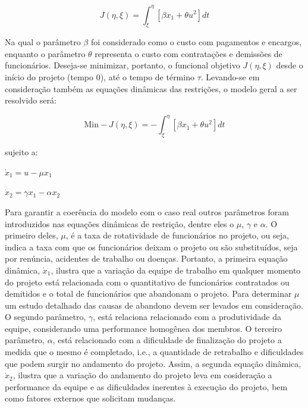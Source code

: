 \documentclass[14pt, oneside]{book}
\theoremstyle{definition}
\begin{document}
            $$J\left(\eta,\xi \right) = \int_{\xi}^{\eta}\left[{\beta x_1 + \theta u^2}\right]dt$$
            
            Na qual o parâmetro $\beta$ foi considerado como o custo com pagamentos e encargos, enquanto o parâmetro $\theta$ representa o custo com contratações e demissões de funcionários. Deseja-se minimizar, portanto, o funcional objetivo $J\left(\eta,\xi \right)$ desde o início do projeto (tempo 0), até o tempo de término $\tau$. Levando-se em consideração também as equações dinâmicas das restrições, o modelo geral a ser resolvido será:
            
            $$\text{Min} -J\left(\eta,\xi \right) =- \int_{\xi}^{\eta}\left[{\beta x_1 + \theta u^2}\right]dt$$
            
            sujeito a:
            
            \begin{center}
            $\dot{x}_1 = u - \mu x_1$
            
            $\dot{x}_2 = \gamma x_1 - \alpha x_2$
            
            \end{center}
           
             Para garantir a coerência do modelo com o caso real outros parâmetros foram introduzidos nas equações dinâmicas de restrição, dentre eles o $\mu$, $\gamma$ e $\alpha$. O primeiro deles, $\mu$, é a taxa de rotatividade de funcionários no projeto, ou seja, indica a taxa com que os funcionários deixam o projeto ou são substituídos, seja por renúncia, acidentes de trabalho ou doenças. Portanto, a primeira equação dinâmica, $\dot{x}_1$, ilustra que a variação da equipe de trabalho em qualquer momento do projeto está relacionada com o quantitativo de funcionários contratados ou demitidos e o total de funcionários que abandonam o projeto. Para determinar $\mu$ um estudo detalhado das causas de abandono devem ser levados em consideração. O segundo parâmetro, $\gamma$, está relaciona relacionado com a produtividade da equipe, considerando uma performance homogênea dos membros. O terceiro parâmetro, $\alpha$, está relacionado com a dificuldade de finalização do projeto a medida que o mesmo é completado, i.e., a quantidade de retrabalho e dificuldades que podem surgir no andamento do projeto. Assim, a segunda equação dinâmica, $\dot{x}_2$, ilustra que a variação do andamento do projeto leva em cosideração a performance da equipe e as dificuldades inerentes à execução do projeto, bem como fatores externos que solicitam mudanças.
            
\end{document}

